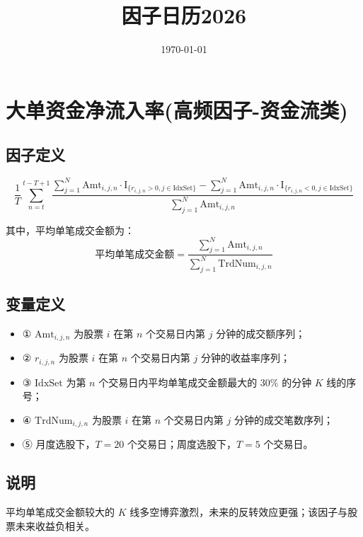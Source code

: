 \documentclass{article}
\title{因子日历2026}
\date{\today}
\begin{document}
\maketitle

\section{大单资金净流入率(高频因子-资金流类)}

\subsection{因子定义}


\begin{equation}
    \frac{1}{T} \sum_{n=t}^{t-T+1} \frac{\sum_{j=1}^{N} \mathrm{Amt}_{i,j,n} \cdot \mathrm{I}_{\{r_{i,j,n}>0, j \in \mathrm{IdxSet}\}} - \sum_{j=1}^{N} \mathrm{Amt}_{i,j,n} \cdot \mathrm{I}_{\{r_{i,j,n}<0, j \in \mathrm{IdxSet}\}}}{\sum_{j=1}^{N} \mathrm{Amt}_{i,j,n}}
\end{equation}

其中，平均单笔成交金额为：
\begin{equation}
    \text{平均单笔成交金额} = \frac{\sum_{j=1}^{N} \mathrm{Amt}_{i,j,n}}{\sum_{j=1}^{N} \mathrm{TrdNum}_{i,j,n}}
\end{equation}

\subsection{变量定义}
\begin{itemize}
    \item ① \( \mathrm{Amt}_{i,j,n} \) 为股票 \( i \) 在第 \( n \) 个交易日内第 \( j \) 分钟的成交额序列；
    \item ② \( r_{i,j,n} \) 为股票 \( i \) 在第 \( n \) 个交易日内第 \( j \) 分钟的收益率序列；
    \item ③ \( \mathrm{IdxSet} \) 为第 \( n \) 个交易日内平均单笔成交金额最大的 30\% 的分钟 \( K \) 线的序号；
    \item ④ \( \mathrm{TrdNum}_{i,j,n} \) 为股票 \( i \) 在第 \( n \) 个交易日内第 \( j \) 分钟的成交笔数序列；
    \item ⑤ 月度选股下，\( T=20 \) 个交易日；周度选股下，\( T=5 \) 个交易日。
\end{itemize}

\subsection{说明}
平均单笔成交金额较大的 \( K \) 线多空博弈激烈，未来的反转效应更强；该因子与股票未来收益负相关。
\end{document}
